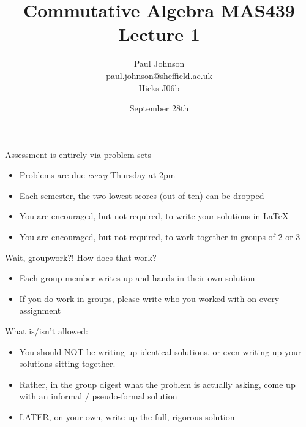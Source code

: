 \documentclass{beamer}
\title{Commutative Algebra MAS439 \\ Lecture 1}
\author{Paul Johnson \\ \href{mailto:paul.johnson@sheffield.ac.uk}{paul.johnson@sheffield.ac.uk} \\ Hicks J06b}
\date{September 28th}
\begin{document}
\begin{frame}
\titlepage
\end{frame}


\begin{frame}{Assessment is entirely via problem sets}

\begin{itemize}
\item Problems are due \emph{every} Thursday at 2pm
\item Each semester, the two lowest scores (out of ten) can be dropped
\item You are encouraged, but not required, to write your solutions in \LaTeX
\item You are encouraged, but not required, to work together in groups of 2 or 3
\end{itemize}
\end{frame}


\begin{frame}{Wait, groupwork?! How does that work?}

\begin{itemize}
\item Each group member writes up and hands in their own solution
\item If you do work in groups, please write who you worked with on every assignment
\end{itemize}

\begin{block}{What is/isn't allowed:}
\begin{itemize}
\item You should \alert{NOT} be writing up identical solutions, or even writing up your solutions sitting together.  
\item Rather, in the group digest what the problem is actually asking, come up with an informal / pseudo-formal solution
\item \alert{LATER}, on your own, write up the full, rigorous solution
\end{itemize}
\end{block}

\end{frame}
\end{document}

